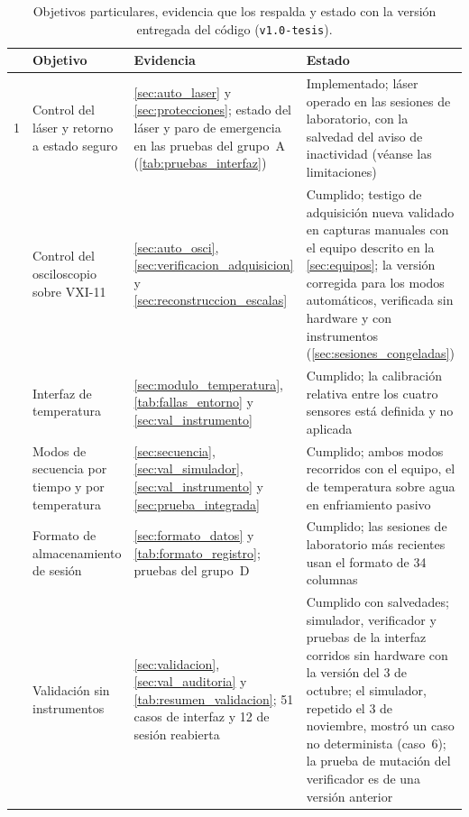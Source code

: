 \begin{table}[H]
  \centering
  \caption{Objetivos particulares, evidencia que los respalda y estado
           con la versión entregada del código (\texttt{v1.0-tesis}).}
  \label{tab:objetivos_evidencia}
  \footnotesize
  \begin{tabular}{p{0.5cm}>{\raggedright\arraybackslash}p{3.3cm}>{\raggedright\arraybackslash}p{4.8cm}>{\raggedright\arraybackslash}p{4.6cm}}
    \toprule
    & \textbf{Objetivo} & \textbf{Evidencia} & \textbf{Estado} \\
    \midrule
    1 & Control del láser y retorno a estado seguro &
    \cref{sec:auto_laser} y \cref{sec:protecciones}; estado del
    láser y paro de emergencia en las pruebas del grupo~A
    (\cref{tab:pruebas_interfaz}) &
    Implementado; láser operado en las sesiones de laboratorio, con la
    salvedad del aviso de inactividad (véanse las limitaciones) \\
    \addlinespace[2pt]
    2 & Control del osciloscopio sobre VXI-11 &
    \cref{sec:auto_osci}, \cref{sec:verificacion_adquisicion} y
    \cref{sec:reconstruccion_escalas} &
    Cumplido; testigo de adquisición nueva validado en capturas
    manuales con el equipo descrito en la \cref{sec:equipos}; la versión
    corregida para los modos automáticos, verificada sin hardware y con
    instrumentos (\cref{sec:sesiones_congeladas}) \\
    \addlinespace[2pt]
    3 & Interfaz de temperatura &
    \cref{sec:modulo_temperatura}, \cref{tab:fallas_entorno} y
    \cref{sec:val_instrumento} &
    Cumplido; la calibración relativa entre los cuatro sensores
    está definida y no aplicada \\
    \addlinespace[2pt]
    4 & Modos de secuencia por tiempo y por temperatura &
    \cref{sec:secuencia}, \cref{sec:val_simulador},
    \cref{sec:val_instrumento} y \cref{sec:prueba_integrada} &
    Cumplido; ambos modos recorridos con el equipo, el de temperatura
    sobre agua en enfriamiento pasivo \\
    \addlinespace[2pt]
    5 & Formato de almacenamiento de sesión &
    \cref{sec:formato_datos} y \cref{tab:formato_registro};
    pruebas del grupo~D &
    Cumplido; las sesiones de laboratorio más recientes usan el formato
    de 34 columnas \\
    \addlinespace[2pt]
    6 & Validación sin instrumentos &
    \cref{sec:validacion}, \cref{sec:val_auditoria} y
    \cref{tab:resumen_validacion}; 51 casos de interfaz y 12 de sesión
    reabierta &
    Cumplido con salvedades; simulador, verificador y pruebas de la
    interfaz corridos sin hardware con la versión del 3 de octubre; el
    simulador, repetido el 3 de noviembre, mostró un caso no
    determinista (caso~6); la prueba de mutación del verificador es de
    una versión anterior \\
    \bottomrule
  \end{tabular}
\end{table}

